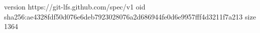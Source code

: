 version https://git-lfs.github.com/spec/v1
oid sha256:ae4328fdf50d076e6deb7923028076a2d686944fe0d6e9957fff4d3211f7a213
size 1364
